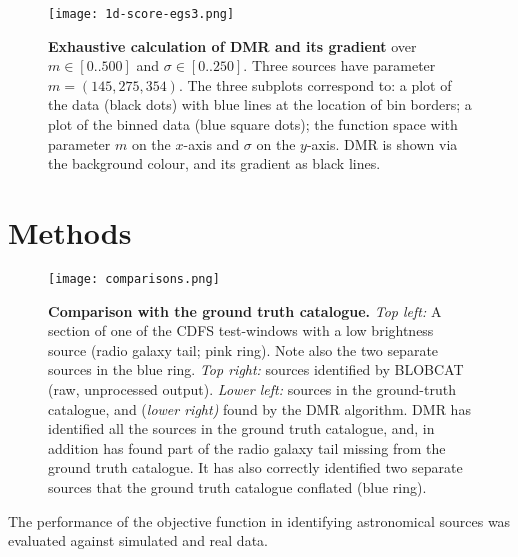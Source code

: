 \documentclass[
    ,final            %
  ]
  {aipproc}
\begin{document}
\begin{figure}
\texttt{[image: 1d-score-egs3.png]}
\caption{\textbf{Exhaustive calculation of DMR and its gradient} over $m \in [0..500]$ and $\sigma \in [0..250]$. Three sources have parameter $m = (145, 275, 354)$. The three subplots correspond to: a plot of the data (black dots) with blue lines at the location of bin borders; a plot of the binned data (blue square dots); the function space with parameter $m$ on the $x$-axis and $\sigma$ on the $y$-axis. DMR is shown via the background colour, and its gradient as black lines.
} 
\label{fig:1d-score-egs3}
\end{figure}

\section{Methods}
\begin{figure}[Hhbt]
\texttt{[image: comparisons.png]}
\caption{\textbf{Comparison with the ground truth catalogue.} {\it Top left:} A section of one of the CDFS test-windows with a low brightness source (radio galaxy tail; pink ring). Note also the two separate sources in the blue ring. {\it Top right:} sources identified by BLOBCAT (raw, unprocessed output). {\it Lower left:} sources in the ground-truth catalogue, and ({\it lower right)} found by the DMR algorithm. DMR has identified all the sources in the ground truth catalogue, and, in addition has found part of the radio galaxy tail missing from the ground truth catalogue. It has also correctly identified two separate sources that the ground truth catalogue conflated (blue ring). %
} 
\label{fig:comps}
\end{figure}
The performance of the objective function in identifying astronomical sources was evaluated against simulated and real data.
\end{document}
